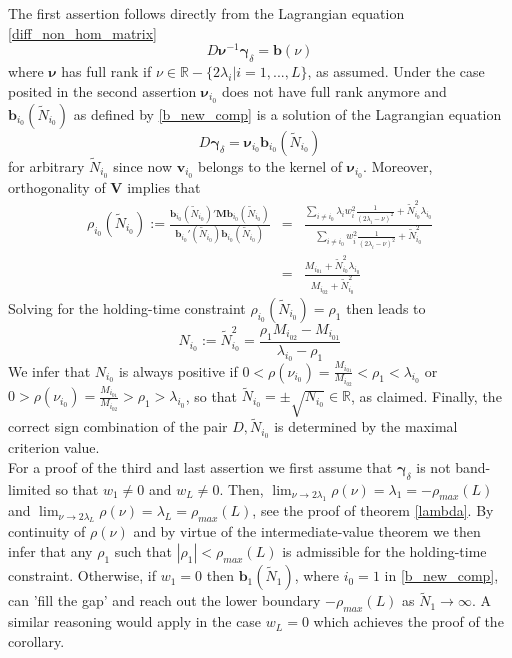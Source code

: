 \documentclass[a4paper]{article}
\begin{document}
The first assertion follows directly from the Lagrangian equation \ref{diff_non_hom_matrix}
\[
D\boldsymbol{\nu}^{-1}\boldsymbol{\gamma}_{\delta}= \mathbf{b}(\nu)
\]
where $\boldsymbol{\nu}$ has full rank if $\nu\in \mathbb{R}-\{2\lambda_i|i=1,...,L\}$, as assumed. Under the case posited in the second assertion $\boldsymbol{\nu}_{i_0}$ does not have full rank anymore and $\mathbf{b}_{i_0}(\tilde{N}_{i_0})$ as defined by \ref{b_new_comp} is a solution of the Lagrangian equation   
\[
D\boldsymbol{\gamma}_{\delta}= \boldsymbol{\nu}_{i_0}\mathbf{b}_{i_0}(\tilde{N}_{i_0})
\]
for arbitrary $\tilde{N}_{i_0}$ since now $\mathbf{v}_{i_0}$ belongs to the kernel of $\boldsymbol{\nu}_{i_0}$. Moreover, orthogonality of $\mathbf{V}$ implies that 
\begin{eqnarray*}
\rho_{i_0}(\tilde{N}_{i_0}):=\frac{\mathbf{b}_{i_0}(\tilde{N}_{i_0})'\mathbf{M}\mathbf{b}_{i_0}(\tilde{N}_{i_0})}{\mathbf{b}_{i_0}'(\tilde{N}_{i_0})\mathbf{b}_{i_0}(\tilde{N}_{i_0})}&=&\frac{\sum_{i\neq i_0}\lambda_{i}w_i^2\frac{1}{(2\lambda_{i}-\nu)^2}+\tilde{N}_{i_0}^2\lambda_{i_0}}{\sum_{i\neq i_0}w_i^2\frac{1}{(2\lambda_{i}-\nu)^2}+\tilde{N}_{i_0}^2}\nonumber\\
&=&\frac{M_{i_01}+\tilde{N}_{i_0}^2\lambda_{i_0}}{M_{i_02}+\tilde{N}_{i_0}^2}
\end{eqnarray*}
Solving for the holding-time constraint $\rho_{i_0}(\tilde{N}_{i_0})=\rho_1$ then leads to 
\[ 
N_{i_0}:=\tilde{N}_{i_0}^2=\frac{\rho_1M_{i_02}-M_{i_01}}{\lambda_{i_0}-\rho_1}
\]
We infer that  $N_{i_0}$ is always positive if $0<\rho(\nu_{i_0})=\frac{M_{i_01}}{M_{i_02}}< \rho_1<\lambda_{i_0}$ or $0>\rho(\nu_{i_0})=\frac{M_{i_01}}{M_{i_02}}> \rho_1>\lambda_{i_0}$, so that $\tilde{N}_{i_0}=\pm\sqrt{N_{i_0}}\in  \mathbb{R}$, as claimed. Finally, the correct sign combination of the pair $D,\tilde{N}_{i_0}$ is determined by the maximal criterion value. \\
For a proof of the third and last assertion we first assume that $\boldsymbol{\gamma}_{\delta}$ is not band-limited so that $w_1\neq 0$ and $w_L\neq 0$. Then, $\lim_{\nu\to 2\lambda_1}\rho(\nu)=\lambda_1=-\rho_{max}(L)$ and $\lim_{\nu\to 2\lambda_L}\rho(\nu)=\lambda_L=\rho_{max}(L)$, see the proof of theorem \ref{lambda}. By continuity of $\rho(\nu)$ and by virtue of the intermediate-value theorem we then infer that any $\rho_1$ such that $|\rho_1|<\rho_{max}(L)$ is admissible for the holding-time constraint. Otherwise, if $w_1=0$ then $\mathbf{b}_{1}(\tilde{N}_{1})$, where $i_0=1$ in \ref{b_new_comp}, can 'fill the gap' and reach out the lower boundary $-\rho_{max}(L)$ as $\tilde{N}_{1}\to\infty$. A similar reasoning would apply in the case $w_L=0$ which achieves the proof of the corollary.\\ 
\end{document}
